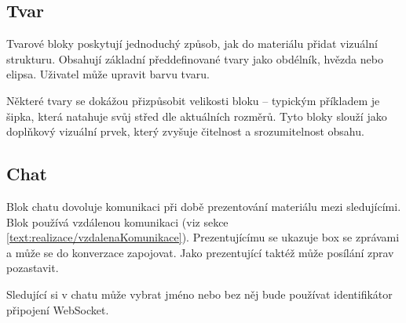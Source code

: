 \subsection{Tvar}

Tvarové bloky poskytují jednoduchý způsob, jak do materiálu přidat vizuální strukturu. 
Obsahují základní předdefinované tvary jako obdélník, hvězda nebo elipsa. Uživatel může upravit barvu tvaru.

Některé tvary se dokážou přizpůsobit velikosti bloku -- typickým příkladem je šipka, která natahuje svůj střed dle aktuálních rozměrů.
Tyto bloky slouží jako doplňkový vizuální prvek, který zvyšuje čitelnost a srozumitelnost obsahu.

\subsection{Chat}

Blok chatu dovoluje komunikaci při době prezentování materiálu mezi sledujícími.
Blok používá vzdálenou komunikaci (viz sekce \ref{text:realizace/vzdalenaKomunikace}).
Prezentujícímu se ukazuje box se zprávami a může se do konverzace zapojovat.
Jako prezentující taktéž může posílání zprav pozastavit.

Sledující si v chatu může vybrat jméno nebo bez něj bude používat identifikátor připojení WebSocket.





